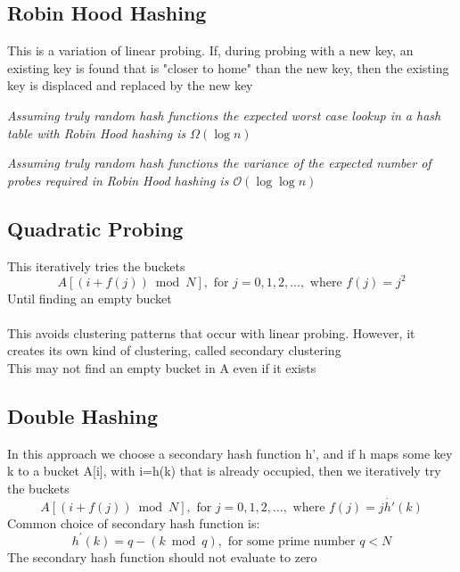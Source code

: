\documentclass{article}[18pt]
\begin{document}
\subsection{Robin Hood Hashing}
This is a variation of linear probing. If, during probing with a new key, an existing key is found that is "closer to home" than the new key, then the existing key is displaced and replaced by the new key
\begin{center}
	\textit{Assuming truly random hash functions the expected worst case lookup in a hash table with Robin Hood hashing is $\Omega(\log n)$}
\end{center}
\begin{center}
	\textit{Assuming truly random hash functions the variance of the expected number of probes required in Robin Hood hashing is $\mathcal{O}(\log\log n)$}
\end{center}
\subsection{Quadratic Probing}
This iteratively tries the buckets
\[
A[(i+f(j)) \bmod N], \text { for } j=0,1,2, \ldots, \text { where } f(j)=j^{2}
\]
Until finding an empty bucket\\
\\
This avoids clustering patterns that occur with linear probing. However, it creates its own kind of clustering, called secondary clustering\\
This may not find an empty bucket in A even if it exists
\subsection{Double Hashing} 
In this approach we choose a secondary hash function h', and if h maps some key k to a bucket A[i], with i=h(k) that is already occupied, then we iteratively try the buckets
\[
A[(i+f(j)) \bmod N], \text { for } j=0,1,2, \ldots, \text { where } f(j)=j \dot{h'}(k)
\]
Common choice of secondary hash function is:
\[
h^{\prime}(k)=q-(k \bmod q), \text { for some prime number } q<N
\]
The secondary hash function should not evaluate to zero
\end{document}
